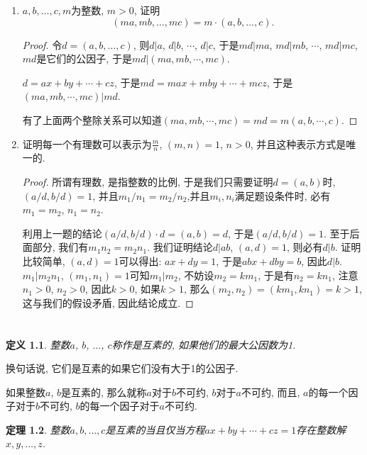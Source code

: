 \documentclass[12pt,a4paper]{book} %
\newtheorem{theorem}{定理}
\newtheorem{definition}[theorem]{定义}
\theoremstyle{remark}
\theoremstyle{example}
\theoremstyle{lemma}
\theoremstyle{corollary}
\numberwithin{theorem}{chapter}
\begin{document}
\begin{enumerate}
\item \label{exercise:II_7} $a, b, \ldots, c, m$为整数, $m > 0$, 证明
\[
(ma, mb, \ldots, mc) = m \cdot (a, b, \ldots, c).
\]
\begin{proof}
令$d = (a, b, \ldots, c)$, 则$d | a$, $d | b$, $\cdots$, $d | c$, 于是$md | ma$, $md | mb$, $\cdots$, $md | mc$, $md$是它们的公因子, 于是$md | (ma, mb, \cdots, mc)$.

$d=ax + by + \cdots + cz$, 于是$md = max + mby + \cdots + mcz$, 于是$(ma, mb, \cdots, mc) | md$.

有了上面两个整除关系可以知道$(ma, mb, \cdots, mc) = md = m(a, b, \cdots, c)$.
\end{proof}

\item \label{exercise:II_8} 证明每一个有理数可以表示为$\frac{m}{n}$, $(m, n) = 1$, $n > 0$, 并且这种表示方式是唯一的.

\begin{proof}
所谓有理数, 是指整数的比例, 于是我们只需要证明$d = (a, b)$时, $(a/d, b/d) = 1$, 并且$m_1/n_1 = m_2 /n_2$,并且$m_i, n_i$满足题设条件时, 必有$m_1 = m_2$, $n_1 = n_2$.

利用上一题的结论$(a/d, b/d) \cdot d = (a, b) = d$, 于是$(a/d, b/d) = 1$. 至于后面部分, 我们有$m_1n_2 = m_2n_1$. 我们证明结论$d | ab$, $(a, d) = 1$, 则必有$d | b$. 证明比较简单, $(a, d) = 1$可以得出: $ax + dy = 1$, 于是$abx + dby = b$, 因此$d | b$. $m_1 | m_2n_1$, $(m_1, n_1) = 1$可知$m_1 | m_2$, 不妨设$m_2 = km_1$, 于是有$n_2 = kn_1$, 注意$n_1 > 0$, $n_2 > 0$, 因此$k > 0$, 如果$k > 1$, 那么$(m_2, n_2) = (km_1, kn_1) = k > 1$, 这与我们的假设矛盾, 因此结论成立.
\end{proof}
\end{enumerate}

\chapter{} \label{chapter:3}
\begin{definition}
整数$a$, $b$, $\ldots$, $c$称作是互素的, 如果他们的最大公因数为1.
\end{definition}

换句话说, 它们是互素的如果它们没有大于1的公因子.

如果整数$a$, $b$是互素的, 那么就称$a$对于$b$不可约, $b$对于$a$不可约, 而且, $a$的每一个因子对于$b$不可约, $b$的每一个因子对于$a$不可约.

\begin{theorem} \label{theorem:III_1}
整数$a, b, \ldots, c$是互素的当且仅当方程$ax + by + \cdots + cz = 1$存在整数解$x, y, \ldots, z$.
\end{theorem}
\end{document}
